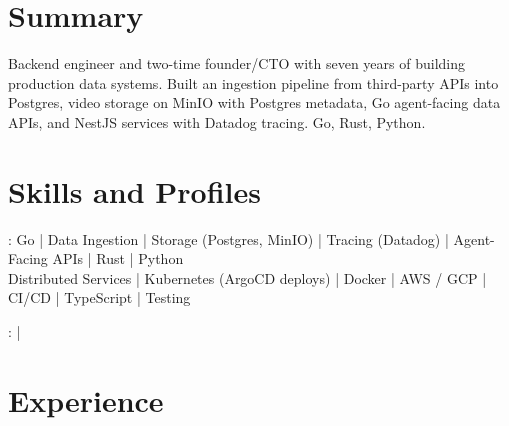 \documentclass[print]{jack-resume}
\begin{document}
\pagecolor{darkmodeBackground}


\begin{minipage}[t][1cm][t]{.03\textwidth}
    \hfill
\end{minipage}

\section{Summary}
Backend engineer and two-time founder/CTO with seven years of building production data systems. Built an ingestion pipeline from third-party APIs into Postgres, video storage on MinIO with Postgres metadata, Go agent-facing data APIs, and NestJS services with Datadog tracing. Go, Rust, Python.
\sectionsep

\section{Skills and Profiles}
:
Go \hfill | \hfill
Data Ingestion \hfill | \hfill
Storage (Postgres, MinIO) \hfill | \hfill
Tracing (Datadog) \hfill | \hfill
Agent-Facing APIs \hfill | \hfill
Rust \hfill | \hfill
Python \\
\hspace{1.0cm} Distributed Services \hfill | \hfill
Kubernetes (ArgoCD deploys) \hfill | \hfill
Docker \hfill | \hfill
AWS / GCP \hfill | \hfill
CI/CD \hfill | \hfill
TypeScript \hfill | \hfill
Testing \\

\raggedright{
    :
      \href{https://www.linkedin.com/in/jack-sturtevant/}{ \ExternalLink} |
     \href{https://github.com/jacksturt}{ \ExternalLink}}

\section{Experience}
\end{document}
